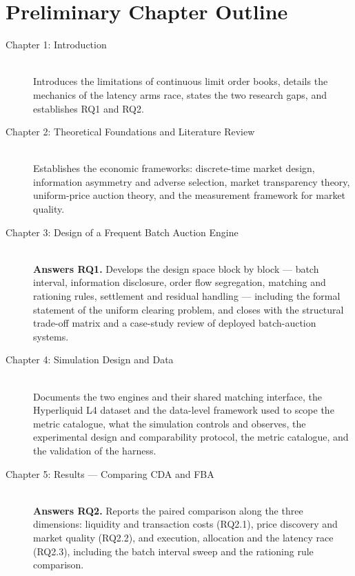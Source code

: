 \documentclass[11pt]{article}
\begin{document}
\newpage

\section{Preliminary Chapter Outline}

\begin{description}
    \item[Chapter 1: Introduction] \hfill \\
    Introduces the limitations of continuous limit order books, details the mechanics of the latency arms race, states the two research gaps, and establishes RQ1 and RQ2.

    \item[Chapter 2: Theoretical Foundations and Literature Review] \hfill \\
    Establishes the economic frameworks: discrete-time market design, information asymmetry and adverse selection, market transparency theory, uniform-price auction theory, and the measurement framework for market quality.

    \item[Chapter 3: Design of a Frequent Batch Auction Engine] \hfill \\
    \textbf{Answers RQ1.} Develops the design space block by block --- batch interval, information disclosure, order flow segregation, matching and rationing rules, settlement and residual handling --- including the formal statement of the uniform clearing problem, and closes with the structural trade-off matrix and a case-study review of deployed batch-auction systems.

    \item[Chapter 4: Simulation Design and Data] \hfill \\
    Documents the two engines and their shared matching interface, the Hyperliquid L4 dataset and the data-level framework used to scope the metric catalogue, what the simulation controls and observes, the experimental design and comparability protocol, the metric catalogue, and the validation of the harness.

    \item[Chapter 5: Results --- Comparing CDA and FBA] \hfill \\
    \textbf{Answers RQ2.} Reports the paired comparison along the three dimensions: liquidity and transaction costs (RQ2.1), price discovery and market quality (RQ2.2), and execution, allocation and the latency race (RQ2.3), including the batch interval sweep and the rationing rule comparison.


\end{description}
\end{document}
